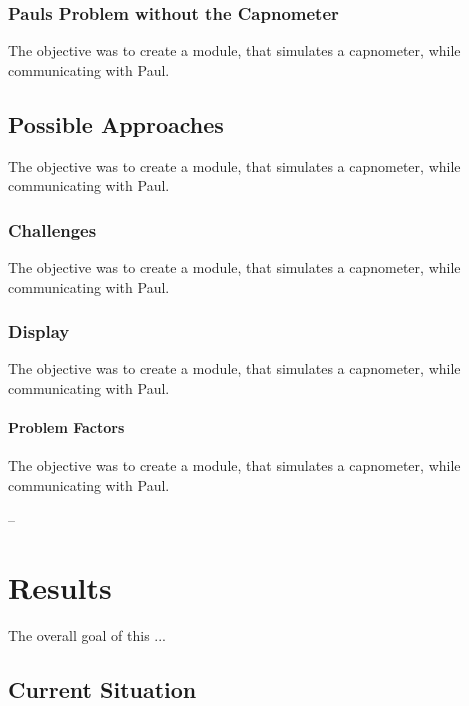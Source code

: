 \documentclass[12pt]{article}
\begin{document}
\subsubsection{Pauls Problem without the Capnometer}

The objective was to create a module, that simulates a capnometer, while communicating
with Paul.


\subsection{Possible Approaches}

The objective was to create a module, that simulates a capnometer, while communicating
with Paul.


\subsubsection{Challenges}

The objective was to create a module, that simulates a capnometer, while communicating
with Paul.


\subsubsection{Display}

The objective was to create a module, that simulates a capnometer, while communicating
with Paul.


\paragraph{Problem Factors}

The objective was to create a module, that simulates a capnometer, while communicating
with Paul.


\clearpage


--
\section{Results}

The overall goal of this ...


\subsection{Current Situation}
\end{document}
